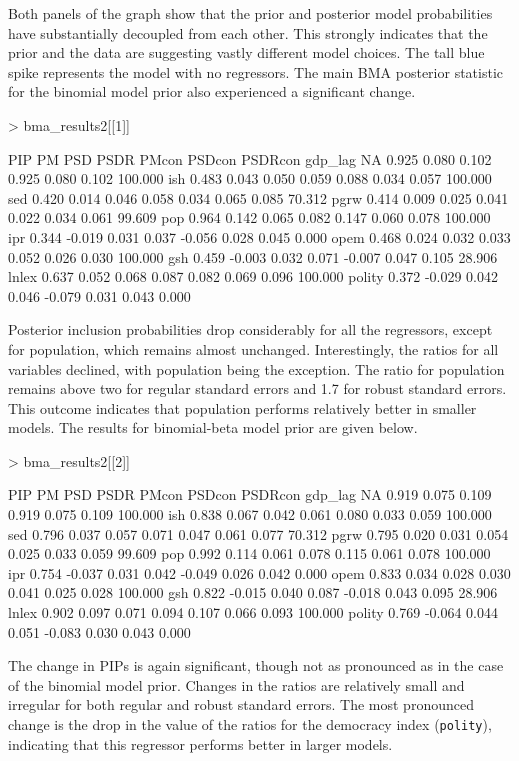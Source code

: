 \documentclass[a4paper]{article}
\begin{document}
Both panels of the graph show that the prior and posterior model probabilities have substantially decoupled from each other.
This strongly indicates that the prior and the data are suggesting vastly different model choices.
The tall blue spike represents the model with no regressors.
The main BMA posterior statistic for the binomial model prior also experienced a significant change.
\begin{Schunk}
\begin{Sinput}
> bma_results2[[1]]
\end{Sinput}
\begin{Soutput}
          PIP     PM   PSD  PSDR  PMcon PSDcon PSDRcon    %
gdp_lag    NA  0.925 0.080 0.102  0.925  0.080   0.102 100.000
ish     0.483  0.043 0.050 0.059  0.088  0.034   0.057 100.000
sed     0.420  0.014 0.046 0.058  0.034  0.065   0.085  70.312
pgrw    0.414  0.009 0.025 0.041  0.022  0.034   0.061  99.609
pop     0.964  0.142 0.065 0.082  0.147  0.060   0.078 100.000
ipr     0.344 -0.019 0.031 0.037 -0.056  0.028   0.045   0.000
opem    0.468  0.024 0.032 0.033  0.052  0.026   0.030 100.000
gsh     0.459 -0.003 0.032 0.071 -0.007  0.047   0.105  28.906
lnlex   0.637  0.052 0.068 0.087  0.082  0.069   0.096 100.000
polity  0.372 -0.029 0.042 0.046 -0.079  0.031   0.043   0.000
\end{Soutput}
\end{Schunk}
Posterior inclusion probabilities drop considerably for all the regressors, except for population, which remains almost unchanged.
Interestingly, the ratios for all variables declined, with population being the exception.
The ratio for population remains above two for regular standard errors and 1.7 for robust standard errors.
This outcome indicates that population performs relatively better in smaller models.
The results for binomial-beta model prior are  given below.
\begin{Schunk}
\begin{Sinput}
> bma_results2[[2]]
\end{Sinput}
\begin{Soutput}
          PIP     PM   PSD  PSDR  PMcon PSDcon PSDRcon    %
gdp_lag    NA  0.919 0.075 0.109  0.919  0.075   0.109 100.000
ish     0.838  0.067 0.042 0.061  0.080  0.033   0.059 100.000
sed     0.796  0.037 0.057 0.071  0.047  0.061   0.077  70.312
pgrw    0.795  0.020 0.031 0.054  0.025  0.033   0.059  99.609
pop     0.992  0.114 0.061 0.078  0.115  0.061   0.078 100.000
ipr     0.754 -0.037 0.031 0.042 -0.049  0.026   0.042   0.000
opem    0.833  0.034 0.028 0.030  0.041  0.025   0.028 100.000
gsh     0.822 -0.015 0.040 0.087 -0.018  0.043   0.095  28.906
lnlex   0.902  0.097 0.071 0.094  0.107  0.066   0.093 100.000
polity  0.769 -0.064 0.044 0.051 -0.083  0.030   0.043   0.000
\end{Soutput}
\end{Schunk}
The change in PIPs is again significant, though not as pronounced as in the case of the binomial model prior.
Changes in the ratios are relatively small and irregular for both regular and robust standard errors.
The most pronounced change is the drop in the value of the ratios for the democracy index (\verb+polity+), indicating that this regressor performs better in larger models.
\end{document}
